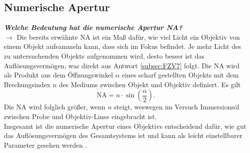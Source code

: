\subsection{\label{subsec:FZV9}Numerische Apertur}
\textbf{\textit{Welche Bedeutung hat die numerische Apertur NA?}} \\
$\rightarrow$
Die bereits erwähnte NA ist ein Maß dafür, wie viel Licht ein Objektiv von einem 
Objekt aufsammeln kann, dass sich im Fokus befindet. Je mehr Licht des zu untersuchenden 
Objekts aufgenommen wird, desto besser ist das Auflösungsvermögen, was direkt aus 
Antwort \ref{subsec:FZV7} folgt. Die NA wird als Produkt aus dem Öffnungswinkel $\alpha$ eines
scharf gestellten Objekts mit dem Brechungsindex $n$ des Mediums zwischen Objekt und Objektiv 
definiert. Es gilt
\begin{equation}
    \text{NA} = n\cdot\sin(\frac{\alpha}{2}).
\end{equation}
Die NA wird folglich größer, wenn $n$ steigt, weswegen im Versuch Immersionsöl zwischen 
Probe und Objektiv-Linse eingebracht ist. \\
Insgesamt ist die numerische Apertur eines Objektivs entscheidend dafür, wie 
gut das Auflösungsvermögen des Gesamtsystems ist und kann als leicht einstellbarer 
Parameter gesehen werden \cite{Auf1, Auf2, Auf3}. \\